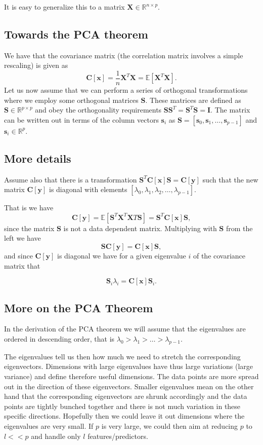 \documentclass[%
oneside,                 %
final,                   %
10pt]{article}
\begin{document}
It is easy to generalize this to a matrix $\bm{X}\in {\mathbb{R}}^{n\times p}$.

\subsection{Towards the PCA theorem}

We have that the covariance matrix (the correlation matrix involves a simple rescaling) is given as
\[
\bm{C}[\bm{x}] = \frac{1}{n}\bm{X}^T\bm{X}= \mathbb{E}[\bm{X}^T\bm{X}].
\]
Let us now assume that we can perform a series of orthogonal transformations where we employ some orthogonal matrices $\bm{S}$.
These matrices are defined as $\bm{S}\in {\mathbb{R}}^{p\times p}$ and obey the orthogonality requirements $\bm{S}\bm{S}^T=\bm{S}^T\bm{S}=\bm{I}$. The matrix can be written out in terms of the column vectors $\bm{s}_i$ as $\bm{S}=[\bm{s}_0,\bm{s}_1,\dots,\bm{s}_{p-1}]$ and $\bm{s}_i \in {\mathbb{R}}^{p}$.

\subsection{More details}

Assume also that there is a transformation $\bm{S}^T\bm{C}[\bm{x}]\bm{S}=\bm{C}[\bm{y}]$ such that the new matrix $\bm{C}[\bm{y}]$ is diagonal with elements $[\lambda_0,\lambda_1,\lambda_2,\dots,\lambda_{p-1}]$.  

That is we have
\[
\bm{C}[\bm{y}] = \mathbb{E}[\bm{S}^T\bm{X}^T\bm{X}T\bm{S}]=\bm{S}^T\bm{C}[\bm{x}]\bm{S},
\]
since the matrix $\bm{S}$ is not a data dependent matrix.   Multiplying with $\bm{S}$ from the left we have
\[
\bm{S}\bm{C}[\bm{y}] = \bm{C}[\bm{x}]\bm{S},
\]
and since $\bm{C}[\bm{y}]$ is diagonal we have for a given eigenvalue $i$ of the covariance matrix that

\[
\bm{S}_i\lambda_i = \bm{C}[\bm{x}]\bm{S}_i.
\]

\subsection{More on the PCA Theorem}

In the derivation of the PCA theorem we will assume that the eigenvalues are ordered in descending order, that is
$\lambda_0 > \lambda_1 > \dots > \lambda_{p-1}$. 

The eigenvalues tell us then how much we need to stretch the
corresponding eigenvectors. Dimensions with large eigenvalues have
thus large variations (large variance) and define therefore useful
dimensions. The data points are more spread out in the direction of
these eigenvectors.  Smaller eigenvalues mean on the other hand that
the corresponding eigenvectors are shrunk accordingly and the data
points are tightly bunched together and there is not much variation in
these specific directions. Hopefully then we could leave it out
dimensions where the eigenvalues are very small. If $p$ is very large,
we could then aim at reducing $p$ to $l << p$ and handle only $l$
features/predictors.
\end{document}
